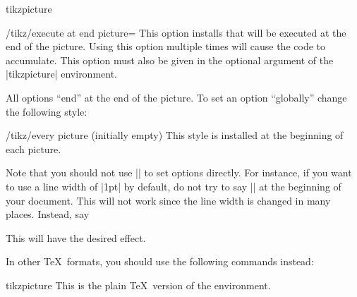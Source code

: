 \begin{environment}{{tikzpicture}}
    \begin{key}{/tikz/execute at end picture=}
        This option installs  that will be executed at the end of
        the picture. Using this option multiple times will cause the code to
        accumulate. This option must also be given in the optional argument of
        the |{tikzpicture}| environment.
\begin{codeexample}[preamble={\usetikzlibrary{backgrounds}}]
\end{codeexample}
    \end{key}

    All options ``end'' at the end of the picture. To set an option
    ``globally'' change the following style:
    \begin{stylekey}{/tikz/every picture (initially \normalfont empty)}
        This style is installed at the beginning of each picture.
\begin{codeexample}
\tikzset{every picture/.style=semithick}
\end{codeexample}
    \end{stylekey}

    Note that you should not use |\tikzset| to set options directly. For
    instance, if you want to use a line width of |1pt| by default, do not try
    to say |\tikzset{line width=1pt}| at the beginning of your document. This
    will not work since the line width is changed in many places. Instead, say
\begin{codeexample}
\end{codeexample}
    This will have the desired effect.
\end{environment}

In other \TeX\ formats, you should use the following commands instead:

\begin{plainenvironment}{{tikzpicture}}
    This is the plain \TeX\ version of the environment.
\end{plainenvironment}

